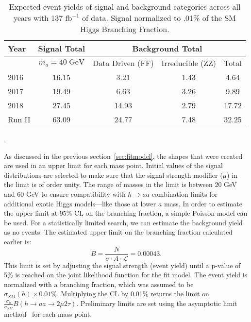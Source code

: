 \begin{table}[h!tbp]
\label{tab:event_yield}
\centering
\begin{tabular}{l||c|c|c||c}
\hline
Year            &  Signal Total             & \multicolumn{3}{c}{Background Total} \\\hline
                & $m_a=40\;\text{GeV}$ & Data Driven (FF)  & Irreducible (ZZ)                 & Total\\\hline
2016                      & 16.15                       & 3.21             & 1.43                   & 4.64\\\hline
2017                      & 19.49                       & 6.63             & 3.26                   & 9.89\\\hline
2018                      & 27.45                       & 14.93             & 2.79                  & 17.72\\\hline\hline
Run II                      & 63.09                       & 24.77             & 7.48                & 32.25\\\hline
\end{tabular}
\caption{Expected event yields of signal and background categories across all years with 137 $\text{fb}^{-1}$ of data. Signal normalized to .01\% of the SM Higgs Branching Fraction.
}
\end{table}.
 



As discussed in the previous section~\ref{sec:fitmodel}, the shapes that were created are used in an upper limit for each mass point. 
Initial values of the signal distributions are selected to make sure that the signal strength modifier ($\mu$) in the limit is of order unity. 
The range of masses in the limit is between 20 GeV and 60 GeV to ensure compatibility with $h \rightarrow a a $ combination limits for additional exotic Higgs models---like those at lower $a$ mass. 
In order to estimate the upper limit at 95\% CL on the branching fraction, a simple Poisson model can be used. For a statistically limited search, we can estimate the background yield as no events. The estimated upper limit on the branching fraction calculated earlier is: 
\begin{equation}B =  \frac{N}{\sigma \cdot A\cdot \mathcal{L}} = 0.00043  \text{.}\end{equation} 
This limit is set by adjusting the signal strength (event yield) until a p-value of 5\% is reached on the joint likelihood function for the fit model. 
The event yield is normalized with a branching fraction, which was assumed to be $\sigma_{SM}(h) \times 0.01\%$.
Multiplying the CL by 0.01\% returns the limit on $\frac{\sigma_h}{\sigma_{SM}} B(h\rightarrow aa\rightarrow2\mu2\tau)$.
Preliminary limits are set using the asymptotic limit method~\cite{Cowan_2011} for each mass point.


